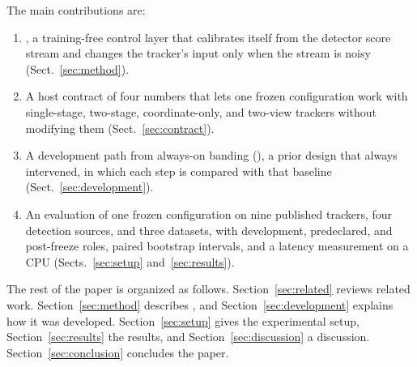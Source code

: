 The main contributions are:
\begin{enumerate}
\item \scl{}, a training-free control layer that calibrates itself from the detector
      score stream and changes the tracker's input only when the stream is
      noisy (Sect.~\ref{sec:method}).
\item A host contract of four numbers that lets one frozen configuration work
      with single-stage, two-stage, coordinate-only, and two-view trackers
      without modifying them (Sect.~\ref{sec:contract}).
\item A development path from always-on banding (\aob{}), a prior design that
      always intervened, in which
      each step is compared with that baseline (Sect.~\ref{sec:development}).
\item An evaluation of one frozen configuration on nine published trackers,
      four detection sources, and three datasets, with development,
      predeclared, and post-freeze roles, paired bootstrap intervals, and a
      latency measurement on a CPU (Sects.~\ref{sec:setup}
      and~\ref{sec:results}).
\end{enumerate}

The rest of the paper is organized as follows. Section~\ref{sec:related}
reviews related work. Section~\ref{sec:method} describes \scl{}, and
Section~\ref{sec:development} explains how it was developed.
Section~\ref{sec:setup} gives the experimental setup,
Section~\ref{sec:results} the results, and Section~\ref{sec:discussion} a
discussion. Section~\ref{sec:conclusion} concludes the paper.
